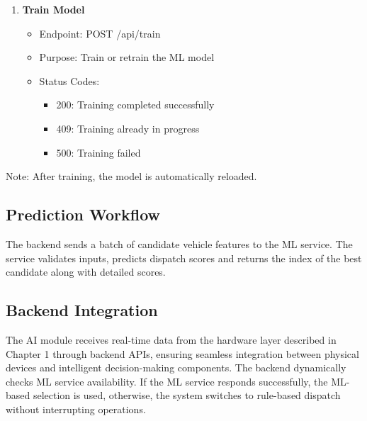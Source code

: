 \begin{enumerate}
\begin{itemize}
\begin{itemize}
            \item 400: Invalid request (missing features, invalid values)
            \item 503: Model not available
            \item 500: Prediction error
        \end{itemize}
        \item Validation Rules:
        \begin{itemize}
            \item distance\_m: >= 0
            \item distance\_cat: 0, 1, or 2
            \item past\_perf: 1.0 to 10.0
            \item fault\_history: >= 0
            \item fatigue\_h: 0.0 to 24.0
            \item fault\_severity: 1, 2, or 3
        \end{itemize}
    \end{itemize}
    \item \textbf{Train Model} \\
    \begin{itemize}
        \item Endpoint: POST /api/train
        \item Purpose: Train or retrain the ML model
        \item Status Codes:
        \begin{itemize}
            \item 200: Training completed successfully
            \item 409: Training already in progress
            \item 500: Training failed
        \end{itemize}
    \end{itemize}
\end{enumerate}

Note: After training, the model is automatically reloaded.

\subsection{Prediction Workflow}
The backend sends a batch of candidate vehicle features to the ML service. The service validates inputs, predicts dispatch scores and returns the index of the best candidate along with detailed scores.

\subsection{Backend Integration}
The AI module receives real-time data from the hardware layer described in Chapter 1 through backend APIs, ensuring seamless integration between physical devices and intelligent decision-making components. The backend dynamically checks ML service availability. If the ML service responds successfully, the ML-based selection is used, otherwise, the system switches to rule-based dispatch without interrupting operations.

